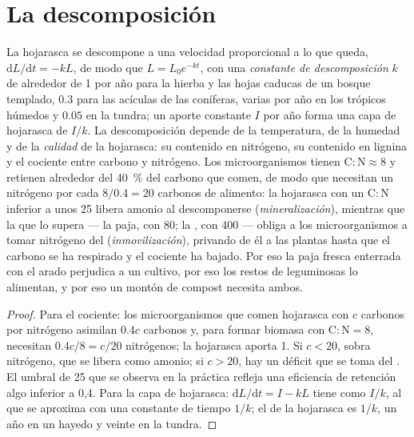 \section{La descomposición}

\begin{theorem}\label{thm:b2:living-soil:decay}
La hojarasca se descompone a una velocidad proporcional a lo que queda,
$\mathrm{d}L/\mathrm{d}t = -kL$, de modo que $L = L_0 e^{-kt}$, con una
\emph{constante de descomposición} $k$ de alrededor de 1 por año para la
hierba y las hojas caducas de un bosque templado, $0.3$ para las acículas
de las coníferas, varias por año en los trópicos húmedos y $0.05$ en la
tundra; un aporte constante $I$ por año forma una capa de hojarasca de
$I/k$. La descomposición depende de la temperatura, de la humedad y de la
\emph{calidad} de la hojarasca: su contenido en nitrógeno, su contenido en
lignina y el cociente entre carbono y nitrógeno. Los microorganismos
tienen $\mathrm{C:N} \approx 8$ y retienen alrededor del \qty{40}{\%} del
carbono que comen, de modo que necesitan un nitrógeno por cada
$8/0.4 = 20$ carbonos de alimento: la hojarasca con un $\mathrm{C:N}$
inferior a unos 25 libera amonio al descomponerse
(\emph{mineralización}), mientras que la que lo supera --- la paja, con
80; la , con 400 --- obliga a los microorganismos a tomar nitrógeno
del  (\emph{inmovilización}), privando de él a las plantas hasta que
el carbono se ha respirado y el cociente ha bajado. Por eso la paja fresca
enterrada con el arado perjudica a un cultivo, por eso los restos de
leguminosas lo alimentan, y por eso un montón de compost necesita ambos.
\end{theorem}
\begin{proof}
Para el cociente: los microorganismos que comen hojarasca con $c$ carbonos
por nitrógeno asimilan $0.4c$ carbonos y, para formar biomasa con
$\mathrm{C:N} = 8$, necesitan $0.4c/8 = c/20$ nitrógenos; la hojarasca
aporta 1. Si $c < 20$, sobra nitrógeno, que se libera como amonio; si
$c > 20$, hay un déficit que se toma del . El umbral de 25 que se
observa en la práctica refleja una eficiencia de retención algo inferior a
0,4. Para la capa de hojarasca: $\mathrm{d}L/\mathrm{d}t = I - kL$
tiene como  $I/k$, al que se aproxima con una constante
de tiempo $1/k$; el  de la hojarasca es $1/k$, un año
en un hayedo y veinte en la tundra.
\end{proof}
